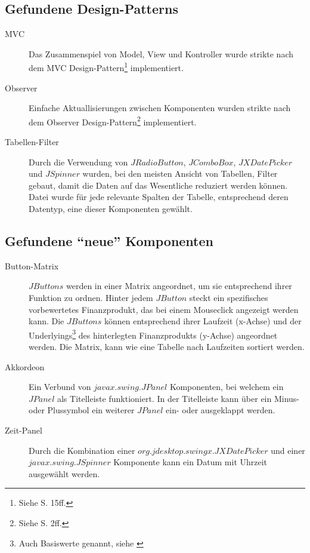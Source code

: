   \subsection{Gefundene Design-Patterns}
  
  \begin{description}
    \item[MVC]
    Das Zusammenspiel von Model, View und Kontroller wurde strikte nach dem
    MVC Design-Pattern\footnote{Siehe \cite{GUIDesignPatterns} S. 15ff.}
    implementiert.
    
    \item[Observer]
    Einfache Aktuallisierungen zwischen Komponenten wurden strikte nach dem
    Observer Design-Pattern\footnote{Siehe \cite{GUIDesignPatterns} S. 2ff.}
    implementiert.
    
    \item[Tabellen-Filter]
    Durch die Verwendung von \(JRadioButton\), \(JComboBox\), \(JXDatePicker\)
    und \(JSpinner\) wurden, bei den meisten Ansicht von Tabellen, Filter gebaut,
    damit die Daten auf das Wesentliche reduziert werden können. Datei wurde
    für jede relevante Spalten der Tabelle, entsprechend deren Datentyp, eine
    dieser Komponenten gewählt.
  \end{description}
  
  \subsection{Gefundene ``neue'' Komponenten}
  
  \begin{description}
    \item[Button-Matrix]
    \(JButtons\) werden in einer Matrix angeordnet, um sie entsprechend ihrer
    Funktion zu ordnen. Hinter jedem \(JButton\) steckt ein spezifisches
    vorbewertetes Finanzprodukt, das bei einem Mouseclick angezeigt werden
    kann. Die \(JButtons\) können entsprechend ihrer Laufzeit (x-Achse) und der
    Underlyings\footnote{Auch Basiswerte genannt, siehe \cite{Basiswerte}} des
    hinterlegten Finanzprodukts (y-Achse) angeordnet werden. Die Matrix, kann
    wie eine Tabelle nach Laufzeiten sortiert werden.
    
    \item[Akkordeon]
    Ein Verbund von \(javax.swing.JPanel\) Komponenten, bei welchem ein
    \(JPanel\) als Titelleiste funktioniert. In der Titelleiste kann über ein
    Minus- oder Plussymbol ein weiterer \(JPanel\) ein- oder ausgeklappt werden.
    
    \item[Zeit-Panel]
    Durch die Kombination einer \(org.jdesktop.swingx.JXDatePicker\) und einer
    \(javax.swing.JSpinner\) Komponente kann ein Datum mit Uhrzeit ausgewählt
    werden.
  \end{description}
  
